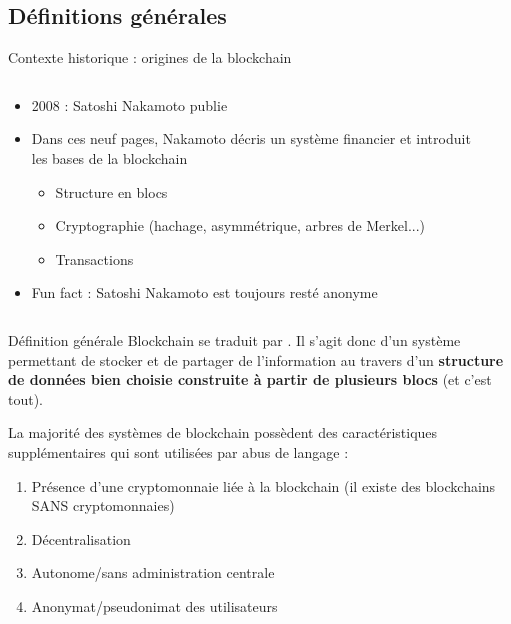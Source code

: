 \subsection{Définitions générales}

\begin{frame}{Contexte historique : origines de la blockchain}
  \begin{columns}
    \begin{column}{0.6\textwidth}
      \begin{itemize}
        \item 2008 : Satoshi Nakamoto publie \href{https://bitcoin.org/bitcoin.pdf}{}
        \item Dans ces neuf pages, Nakamoto décris un système financier et introduit les bases de la blockchain
              \begin{itemize}
                \item Structure en blocs
                \item Cryptographie (hachage, asymmétrique, arbres de Merkel...)
                \item Transactions
              \end{itemize}
        \item Fun fact : Satoshi Nakamoto est toujours resté anonyme
      \end{itemize}
    \end{column}
    \begin{column}{0.4\textwidth}
      
    \end{column}
  \end{columns}
\end{frame}

\begin{frame}{Définition générale}
  Blockchain se traduit par .
  Il s'agit donc d'un système permettant de stocker et de partager de l'information au travers d'un \textbf{structure de données bien choisie construite à partir de plusieurs blocs} (et c'est tout).

  La majorité des systèmes de blockchain possèdent des caractéristiques supplémentaires qui sont utilisées par abus de langage :

  \begin{enumerate}
    \item Présence d'une cryptomonnaie liée à la blockchain (il existe des blockchains SANS cryptomonnaies)
    \item Décentralisation
    \item Autonome/sans administration centrale
    \item Anonymat/pseudonimat des utilisateurs
  \end{enumerate}
\end{frame}

